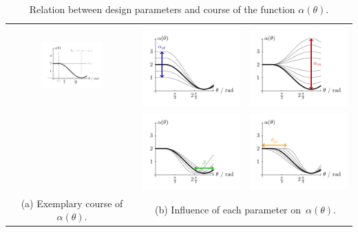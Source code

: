 \begin{table}[H]
\begin{center}
\begin{tabular}{ccc}
\multirow{2}{*}{\includegraphics[width=0.5\textwidth]{micarray_alpha.pdf}} & &\\
& \includegraphics[width=.2\textwidth]{micarray_alpha_st.pdf} & \includegraphics[width=.2\textwidth]{micarray_alpha_m.pdf}\\
& \includegraphics[width=.2\textwidth]{micarray_theta_m.pdf} & \includegraphics[width=.2\textwidth]{micarray_theta_st.pdf}\\
(a) Exemplary course of $\alpha(\theta)$. & \multicolumn{2}{c}{(b) Influence of each parameter on~$\alpha(\theta)$.}\\
\end{tabular}
 \caption{Relation between design parameters and course of the function $\alpha(\theta)$.}
 \label{Tab_alpha}
\end{center}
\end{table}


